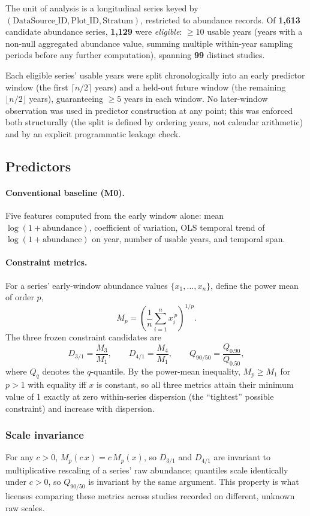 \documentclass[11pt]{article}
\newcommand{\Dthreeone}{D_{3/1}}
\newcommand{\Dfourone}{D_{4/1}}
\newcommand{\Qninefifty}{Q_{90/50}}
\begin{document}
The unit of analysis is a longitudinal series keyed by
$(\mathrm{DataSource\_ID}, \mathrm{Plot\_ID}, \mathrm{Stratum})$,
restricted to abundance records. Of \textbf{1{,}613} candidate abundance
series, \textbf{1{,}129} were \emph{eligible}: $\geq 10$ usable years
(years with a non-null aggregated abundance value, summing multiple
within-year sampling periods before any further computation), spanning
\textbf{99} distinct studies.

Each eligible series' usable years were split chronologically into an
early predictor window (the first $\lceil n/2 \rceil$ years) and a held-out
future window (the remaining $\lfloor n/2 \rfloor$ years), guaranteeing
$\geq 5$ years in each window. No later-window observation was used in
predictor construction at any point; this was enforced both structurally
(the split is defined by ordering years, not calendar arithmetic) and by
an explicit programmatic leakage check.

\subsection{Predictors}

\paragraph{Conventional baseline (M0).} Five features computed from the
early window alone: mean $\log(1+\mathrm{abundance})$, coefficient of
variation, OLS temporal trend of $\log(1+\mathrm{abundance})$ on year,
number of usable years, and temporal span.

\paragraph{Constraint metrics.} For a series' early-window abundance
values $\{x_1,\dots,x_n\}$, define the power mean of order $p$,
\[
M_p = \left(\frac{1}{n}\sum_{i=1}^{n} x_i^{\,p}\right)^{1/p}.
\]
The three frozen constraint candidates are
\[
\Dthreeone = \frac{M_3}{M_1}, \qquad
\Dfourone = \frac{M_4}{M_1}, \qquad
\Qninefifty = \frac{Q_{0.90}}{Q_{0.50}},
\]
where $Q_q$ denotes the $q$-quantile. By the power-mean inequality,
$M_p \geq M_1$ for $p>1$ with equality iff $x$ is constant, so all three
metrics attain their minimum value of 1 exactly at zero within-series
dispersion (the ``tightest'' possible constraint) and increase with
dispersion.

\subsubsection{Scale invariance}
\label{sec:invariance}
For any $c>0$, $M_p(c\,x) = c\,M_p(x)$, so $\Dthreeone$ and $\Dfourone$
are invariant to multiplicative rescaling of a series' raw abundance;
quantiles scale identically under $c>0$, so $\Qninefifty$ is invariant by
the same argument. This property is what licenses comparing these
metrics across studies recorded on different, unknown raw scales.
\end{document}
